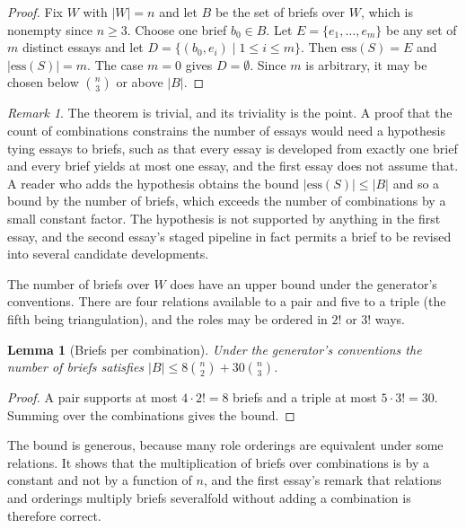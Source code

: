 \documentclass[11pt]{article}
\theoremstyle{plain}
\newtheorem{lemma}[theorem]{Lemma}
\theoremstyle{definition}
\theoremstyle{remark}
\newtheorem{remark}[theorem]{Remark}
\begin{document}
\begin{proof}
Fix $W$ with $|W|=n$ and let $B$ be the set of briefs over $W$, which is nonempty since $n\ge3$. Choose one brief $b_0\in B$. Let $E=\{e_1,\ldots,e_m\}$ be any set of $m$ distinct essays and let $D=\{(b_0,e_i)\mid 1\le i\le m\}$. Then $\mathrm{ess}(S)=E$ and $|\mathrm{ess}(S)|=m$. The case $m=0$ gives $D=\emptyset$. Since $m$ is arbitrary, it may be chosen below $\binom{n}{3}$ or above $|B|$. \qedhere
\end{proof}

\begin{remark}
The theorem is trivial, and its triviality is the point. A proof that the count of combinations constrains the number of essays would need a hypothesis tying essays to briefs, such as that every essay is developed from exactly one brief and every brief yields at most one essay, and the first essay does not assume that. A reader who adds the hypothesis obtains the bound $|\mathrm{ess}(S)|\le|B|$ and so a bound by the number of briefs, which exceeds the number of combinations by a small constant factor. The hypothesis is not supported by anything in the first essay, and the second essay's staged pipeline in fact permits a brief to be revised into several candidate developments.
\end{remark}

The number of briefs over $W$ does have an upper bound under the generator's conventions. There are four relations available to a pair and five to a triple (the fifth being triangulation), and the roles may be ordered in $2!$ or $3!$ ways.

\begin{lemma}[Briefs per combination]\label{lem:briefs}
Under the generator's conventions the number of briefs satisfies $|B|\le 8\binom{n}{2}+30\binom{n}{3}$.
\end{lemma}

\begin{proof}
A pair supports at most $4\cdot 2!=8$ briefs and a triple at most $5\cdot3!=30$. Summing over the combinations gives the bound. \qedhere
\end{proof}

The bound is generous, because many role orderings are equivalent under some relations. It shows that the multiplication of briefs over combinations is by a constant and not by a function of $n$, and the first essay's remark that relations and orderings multiply briefs severalfold without adding a combination is therefore correct.
\end{document}
